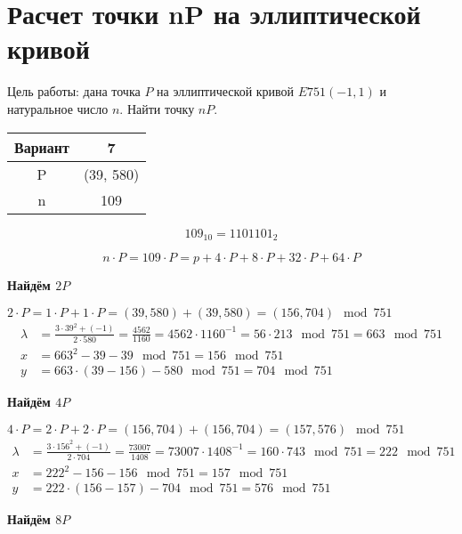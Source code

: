 \section{Расчет точки nP на эллиптической кривой}

Цель работы: дана точка $P$ на эллиптической кривой $E751(−1,1)$ и натуральное число $n$. Найти точку $nP$.

\begin{table}[H]
	\centering
	\begin{tabular}{|c|c|}
		\hline 
		Вариант & 7 \\ 
		\hline 
		P & (39, 580) \\ 
		\hline 
		n & 109 \\ 
		\hline 
	\end{tabular} 
\end{table}

\[
109_{10} = 1101101_{2}
\]

\[
n \cdot P = 109 \cdot P = p+  4 \cdot P + 8\cdot P + 32 \cdot P + 64 \cdot P
\]

\textbf{Найдём $2P$}

$2 \cdot P = 1 \cdot P + 1 \cdot P = (39, 580) + (39, 580) = (156, 704) \mod 751$
\begin{equation*}
	\begin{aligned}
		\lambda &= \frac{ 3 \cdot 39^2 + (-1) }{2 \cdot 580} = \frac{4562}{1160} = 4562 \cdot 1160^{-1} = 56 \cdot 213\mod{751} = 663\mod{751} \\
		x &= 663^2 - 39 - 39 \mod{751} = 156\mod{751} \\
		y &= 663 \cdot (39 - 156) - 580\mod{751} = 704\mod{751}
	\end{aligned}
\end{equation*}

\textbf{Найдём $4P$}

$4 \cdot P = 2 \cdot P + 2 \cdot P = (156, 704) + (156, 704) = (157, 576) \mod 751$
\begin{equation*}
	\begin{aligned}
		\lambda &= \frac{ 3 \cdot 156^2 + (-1) }{2 \cdot 704} = \frac{73007}{1408} = 73007 \cdot 1408^{-1} = 160 \cdot 743\mod{751} = 222\mod{751} \\
		x &= 222^2 - 156 - 156 \mod{751} = 157\mod{751} \\
		y &= 222 \cdot (156 - 157) - 704\mod{751} = 576\mod{751}
	\end{aligned}
\end{equation*}

\textbf{Найдём $8P$}

